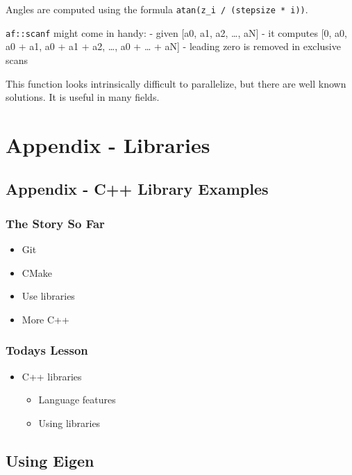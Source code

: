 Angles are computed using the formula
\texttt{atan(z\_i / (stepsize * i))}.

\texttt{af::scanf} might come in handy: - given {[}a0, a1, a2, \ldots{},
aN{]} - it computes {[}0, a0, a0 + a1, a0 + a1 + a2, \ldots{}, a0 +
\ldots{} + aN{]} - leading zero is removed in exclusive scans

This function looks intrinsically difficult to parallelize, but there
are well known solutions. It is useful in many fields.

\section{Appendix - Libraries}\label{appendix---libraries}

\subsection{Appendix - C++ Library
Examples}\label{appendix---c-library-examples}

\subsubsection{The Story So Far}\label{the-story-so-far-2}

\begin{itemize}
\itemsep1pt\parskip0pt
\item
  Git
\item
  CMake
\item
  Use libraries
\item
  More C++
\end{itemize}

\subsubsection{Todays Lesson}\label{todays-lesson-3}

\begin{itemize}
\itemsep1pt\parskip0pt
\item
  C++ libraries

  \begin{itemize}
  \itemsep1pt\parskip0pt
  \item
    Language features
  \item
    Using libraries
  \end{itemize}
\end{itemize}

\subsection{Using Eigen}\label{using-eigen}

